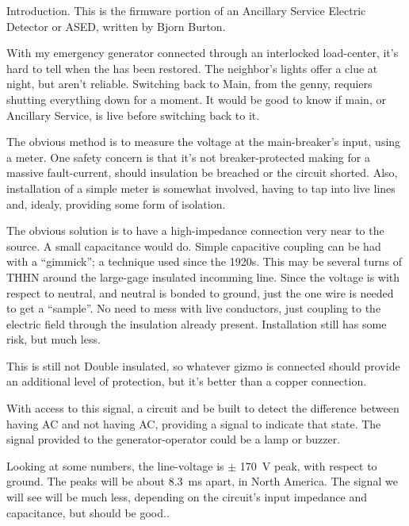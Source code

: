 


\nocon %
\datethis %


Introduction. This is the firmware portion of an Ancillary Service
Electric Detector or ASED, written by Bjorn Burton.

With my  emergency generator connected through an interlocked load-center, it's
hard to tell when the  has been restored.
The neighbor's lights offer a clue at night, but aren't reliable.
Switching back to Main, from the genny, requiers shutting  everything down for
a moment.
It would be good to know if main, or Ancillary Service, is live before
switching back to it.

The obvious method is to measure the voltage at the main-breaker's input, using
a meter.
One safety concern is that it's not breaker-protected making for a massive
fault-current, should insulation be breached or the circuit shorted.
Also, installation of a simple meter is somewhat involved, having to tap into
live lines and, idealy, providing some form of isolation.

The obvious solution is to have a high-impedance connection very near to the
source.
A small capacitance would do.
Simple capacitive coupling can be had with a ``gimmick''; a technique used
since the 1920s.
This may be several turns of THHN around the large-gage insulated incomming
line.
Since the voltage is with respect to neutral, and neutral is bonded to ground,
just the one wire is needed to get a ``sample''.
No need to mess with live conductors, just coupling to the electric field
through the insulation already present.
Installation still has some risk, but much less.

This is still not Double insulated, so whatever gizmo is connected should
provide an additional level of protection, but it's better than a copper
connection.

With access to this signal, a circuit and be built to detect the difference
between having AC and not having AC,  providing a signal to indicate that
state.
The signal provided to the generator-operator could be a lamp or buzzer.

Looking at some numbers, the line-voltage is $\pm$ 170~V peak, with respect to
ground.
The peaks will be about 8.3~ms apart, in North America.
The signal we  will see will be much less, depending on the circuit's input
impedance and capacitance, but should be good..

